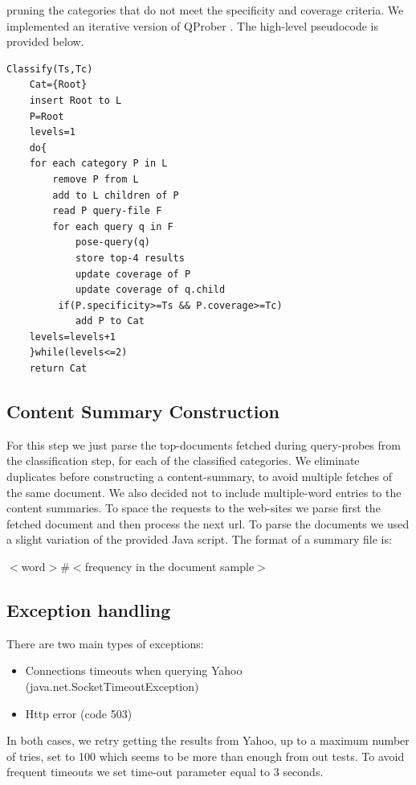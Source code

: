 \documentclass[11pt]{article}
\begin{document}
pruning the categories that do not meet the specificity and coverage criteria. We implemented an iterative version of QProber \cite{QProb}. The high-level pseudocode is provided below.

\begin{verbatim}
Classify(Ts,Tc)
    Cat={Root}
    insert Root to L
    P=Root
    levels=1
    do{
    for each category P in L
        remove P from L
        add to L children of P
        read P query-file F
        for each query q in F
            pose-query(q)
            store top-4 results
            update coverage of P
            update coverage of q.child
         if(P.specificity>=Ts && P.coverage>=Tc)
            add P to Cat
    levels=levels+1
    }while(levels<=2)
    return Cat
\end{verbatim}

\subsection{Content Summary Construction}

For this step we just parse the top-documents fetched during query-probes from the classification step, for each of the classified categories. We eliminate duplicates before constructing 
a content-summary, to avoid multiple fetches of the same document. We also decided not to include multiple-word entries to the content summaries. To space the requests to the web-sites we parse first the fetched document and then process the next url. To parse the documents we used a slight variation of the provided Java script. The format of a summary file is:

$<$word$>\#<$frequency in the document sample$>$

\subsection{Exception handling}
There are two main types of exceptions:

\begin{itemize}
\item Connections timeouts when querying Yahoo (java.net.SocketTimeoutException)
\item Http error (code 503)
\end{itemize}

In both cases, we retry getting the results from Yahoo, up to a maximum number of tries, set to 100 which seems to be more than enough from out tests. To avoid frequent timeouts we set time-out parameter equal to 3 seconds.
\end{document}
